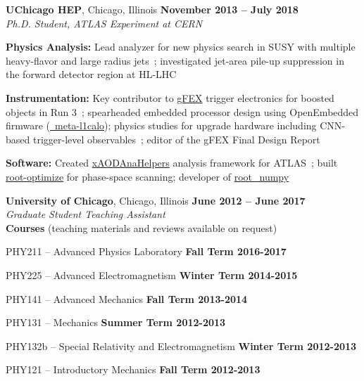 \documentclass[margin,line]{resume}
\begin{document}
\begin{resume}
\textbf{UChicago HEP}, Chicago, Illinois \hfill \textbf{November 2013 -- July 2018}\\
\textsl{Ph.D. Student, ATLAS Experiment at CERN}
\begin{list2}
  \item \textbf{Physics Analysis:} Lead analyzer for new physics search in SUSY with multiple heavy-flavor and large radius jets~\cite{SUSY-2016-10, SUSY-2015-10, ATLAS-CONF-2017-021, ATLAS-CONF-2016-052, ATLAS-CONF-2015-067}; investigated jet-area pile-up suppression in the forward detector region at HL-LHC~\cite{HFSF2017}
  \item \textbf{Instrumentation:} Key contributor to \href{https://gfex.cern.ch/}{gFEX} trigger electronics for boosted objects in Run 3~\cite{Tang:2104248, DPF2017gFEX}; spearheaded embedded processor design using OpenEmbedded firmware (\href{https://github.com/kratsg/meta-l1calo}{~meta-l1calo}); physics studies for upgrade hardware including CNN-based trigger-level observables~\cite{DPF2017gFEX}; editor of the gFEX Final Design Report~\cite{Begel:2233958}
  \item \textbf{Software:} Created \href{https://xaodanahelpers.readthedocs.io/en/master/}{xAODAnaHelpers} analysis framework for ATLAS~\cite{giordon_stark_2020_3743307}; built \href{https://github.com/kratsg/Optimization}{root-optimize} for phase-space scanning; developer of \href{http://scikit-hep.org/root_numpy/}{root\_numpy}~\cite{Noel_Dawe_2017}
\end{list2}

\textbf{University of Chicago}, Chicago, Illinois \hfill \textbf{June 2012 -- June 2017}\\
\textsl{Graduate Student Teaching Assistant}\\
\textbf{Courses} (teaching materials and reviews available on request)
\begin{list2}
  \item PHY211 -- Advanced Physics Laboratory \hfill \textbf{Fall Term 2016-2017}
  \item PHY225 -- Advanced Electromagnetism \hfill \textbf{Winter Term 2014-2015}
  \item PHY141 -- Advanced Mechanics \hfill \textbf{Fall Term 2013-2014}
  \item PHY131 -- Mechanics \hfill \textbf{Summer Term 2012-2013}
  \item PHY132b -- Special Relativity and Electromagnetism \hfill \textbf{Winter Term 2012-2013}
  \item PHY121 -- Introductory Mechanics \hfill \textbf{Fall Term 2012-2013}
\end{list2}


\end{resume}
\end{document}
